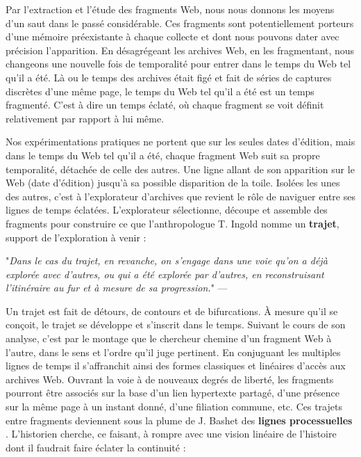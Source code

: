 \documentclass[symmetric,justified,marginals=raggedouter]{tufte-book}
\begin{document}
Par l'extraction et l'étude des fragments Web, nous nous donnons les moyens d'un saut dans le passé considérable. Ces fragments sont potentiellement porteurs d'une mémoire préexistante à chaque collecte et dont nous pouvons dater avec précision l'apparition. En désagrégeant les archives Web, en les fragmentant, nous changeons une nouvelle fois de temporalité pour entrer dans le temps du Web tel qu'il a été. Là ou le temps des archives était figé et fait de séries de captures discrètes d'une même page, le temps du Web tel qu'il a été est un temps fragmenté. C'est à dire un temps éclaté, où chaque fragment se voit définit relativement par rapport à lui même.

Nos expérimentations pratiques ne portent que sur les seules dates d'édition, mais dans le temps du Web tel qu'il a été, chaque fragment Web suit sa propre temporalité, détachée de celle des autres. Une ligne allant de son apparition sur le Web (date d'édition) jusqu'à sa possible disparition de la toile. Isolées les unes des autres, c'est à l'explorateur d'archives que revient le rôle de naviguer entre ses lignes de temps éclatées. L'explorateur sélectionne, découpe et assemble des fragments pour construire ce que l'anthropologue T. Ingold nomme un \textbf{trajet}, support de l'exploration à venir : \\ 

\begin{fullwidth}
"\textit{Dans le cas du trajet, en revanche, on s'engage dans une voie qu'on a déjà explorée avec d’autres, ou qui a été explorée par d'autres, en reconstruisant l'itinéraire au fur et à mesure de sa progression.}" --- \citep[p.26]{ingold_breve_2013}\\
\end{fullwidth} 

\noindent Un trajet est fait de détours, de contours et de bifurcations. À mesure qu'il se conçoit, le trajet se développe et s'inscrit dans le temps. Suivant le cours de son analyse, c'est par le montage que le chercheur chemine d'un fragment Web à l'autre, dans le sens et l'ordre qu'il juge pertinent. En conjuguant les multiples lignes de temps il s'affranchit ainsi des formes classiques et linéaires d'accès aux archives Web. Ouvrant la voie à de nouveaux degrés de liberté, les fragments pourront être associés sur la base d'un lien hypertexte partagé, d'une présence sur la même page à un instant donné, d'une filiation commune, etc. Ces trajets entre fragments deviennent sous la plume de J. Bashet des \textbf{lignes processuelles} \citep[p.227]{baschet_defaire_2018}. L'historien cherche, ce faisant, à rompre avec une vision linéaire de l'histoire dont il faudrait faire éclater la continuité : \\
\end{document}
